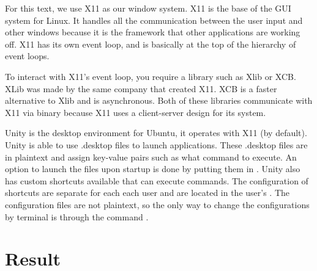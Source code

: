 \documentclass[12pt]{article}
\begin{document}
For this text, we use X11 as our window system.
X11 is the base of the GUI system for Linux.
It handles all the communication between the user input and other windows because it is the framework that other applications are working off.
X11 has its own event loop, and is basically at the top of the hierarchy of event loops.

To interact with X11's event loop, you require a library such as Xlib or XCB.
XLib was made by the same company that created X11.
XCB is a faster alternative to Xlib and is asynchronous.
Both of these libraries communicate with X11 via binary because X11 uses a client-server design for its system.

Unity is the desktop environment for Ubuntu, it operates with X11 (by default). Unity is able to use .desktop files to launch applications.
These .desktop files are in plaintext and assign key-value pairs such as what command to execute.
An option to launch the files upon startup is done by putting them in .
Unity also has custom shortcuts available that can execute commands.
The configuration of shortcuts are separate for each each user and are located in the user's .
The configuration files are not plaintext, so the only way to change the configurations by terminal is through the command .


	
\section{Result}
\end{document}
